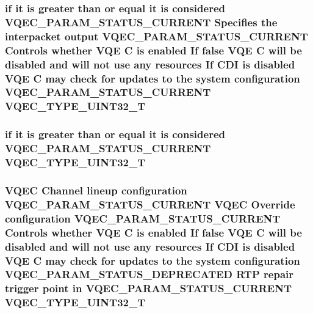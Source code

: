 \subsubsection{\setlength{\rightskip}{0pt plus 5cm}if it is greater than or equal it is considered VQEC\_\-PARAM\_\-STATUS\_\-CURRENT Specifies the interpacket output VQEC\_\-PARAM\_\-STATUS\_\-CURRENT Controls whether VQE \bf{C} is enabled If false VQE \bf{C} will be disabled and will not use any resources If CDI is disabled VQE \bf{C} may check for updates \bf{to} the system configuration VQEC\_\-PARAM\_\-STATUS\_\-CURRENT \bf{VQEC\_\-TYPE\_\-UINT32\_\-T}}\label{vqec__cfg__settings_8h_a4306321194a09e827323f47519a8d59}


\subsubsection{\setlength{\rightskip}{0pt plus 5cm}if it is greater than or equal it is considered VQEC\_\-PARAM\_\-STATUS\_\-CURRENT \bf{VQEC\_\-TYPE\_\-UINT32\_\-T}}\label{vqec__cfg__settings_8h_17400c57b695cc4445fddd590fc0967d}


\subsubsection{\setlength{\rightskip}{0pt plus 5cm}VQEC Channel lineup configuration VQEC\_\-PARAM\_\-STATUS\_\-CURRENT VQEC Override configuration VQEC\_\-PARAM\_\-STATUS\_\-CURRENT Controls whether VQE \bf{C} is enabled If false VQE \bf{C} will be disabled and will not use any resources If CDI is disabled VQE \bf{C} may check for updates \bf{to} the system configuration VQEC\_\-PARAM\_\-STATUS\_\-DEPRECATED RTP repair trigger point in VQEC\_\-PARAM\_\-STATUS\_\-CURRENT \bf{VQEC\_\-TYPE\_\-UINT32\_\-T}}\label{vqec__cfg__settings_8h_422d6b715114531b8bbeb59a9eaf1669}


